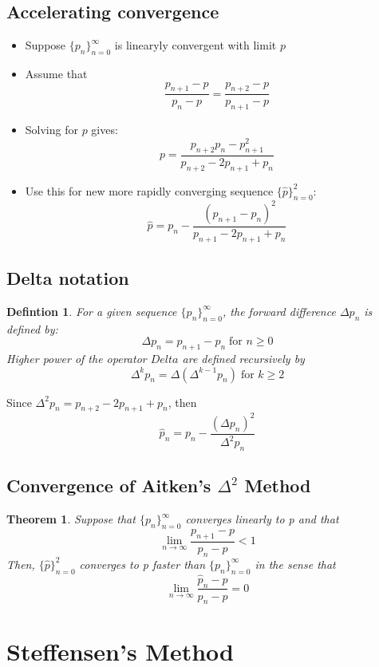 \documentclass[12pt]{article}
\newtheorem{theorem}{Theorem}[subsection]
\newtheorem*{definition}{Defintion}
\begin{document}
\subsection{Accelerating convergence}
\begin{itemize}
	\item Suppose $\{p_n\}_{n=0}^{\infty}$ is linearyly convergent with limit $p$
	\item Assume that $$\frac{p_{n+1}-p}{p_n -p} = \frac{p_{n+2}-p}{p_{n+1} -p}$$
	\item Solving for $p$ gives: $$p = \frac{p_{n+2}p_n-p_{n+1}^2}{p_{n+2} -2p_{n+1}+p_n}$$
	\item Use this for new more rapidly converging sequence $\{\hat{p}\}_{n=0}^2$: $$\hat{p} = p_n -\frac{(p_{n+1} -p_n)^2}{p_{n+1} -2p_{n+1} +p_n}$$
\end{itemize}

\subsection{Delta notation}
\begin{definition}
	For a given sequence $\{p_n\}_{n=0}^{\infty}$, the forward difference $\Delta p_n$ is defined by:
	$$\Delta p_n = p_{n+1} - p_n \; \text{for $n \geq 0$}$$
	Higher power of the operator $Delta$ are defined recursively by $$\Delta^kp_n = \Delta(\Delta^{k-1}p_n) \; \text{for $k \geq 2$}$$
	\end{definition}
Since $\Delta^2p_n = p_{n+2} -2p_{n+1} + p_n$, then $$\hat{p}_n = p_n - \frac{(\Delta p_n)^2}{\Delta^2 p_n}$$
\subsection{Convergence of Aitken's $\Delta^2$ Method}
\begin{theorem}
Suppose that $\{p_n\}_{n=0}^{\infty}$ converges linearly to p and that $$\lim_{n \to \infty} \frac{p_{n+1} - p}{p_n - p} <1$$
Then,  	$\{\hat{p}\}_{n=0}^2$ converges to p faster than $\{p_n\}_{n=0}^{\infty}$ in the sense that 
$$\lim_{n \to \infty}\frac{\hat{p}_n -p}{p_n - p} = 0$$
\end{theorem}


\section{Steffensen's Method}
\end{document}
